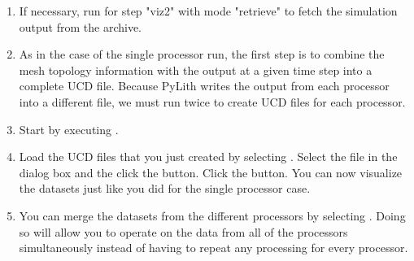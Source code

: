 \begin{enumerate}
\item If necessary, run  for step "viz2" with mode
  "retrieve" to fetch the simulation output from the archive.

  \begin{screen}
    \shellprompt{}
  \end{screen}
  
\item As in the case of the single processor run, the first step is to
  combine the mesh topology information with the output at a given
  time step into a complete UCD file. Because PyLith writes the output
  from each processor into a different file, we must run 
  twice to create UCD files for each processor.

  \begin{screen}
    \shellprompt{}
    \shellprompt{}
  \end{screen}

\item Start  by executing .

  \begin{screen}
    \shellprompt{}
  \end{screen}
  
\item Load the UCD files that you just created by selecting
  \guiselect{}. Select the file in
  the dialog box and the click the  button. Click the
   button. You can now visualize the datasets just
  like you did for the single processor case.
\item You can merge the datasets from the different processors by
  selecting \guiselect{}. Doing so
  will allow you to operate on the data from all of the processors
  simultaneously instead of having to repeat any processing for every
  processor.
\end{enumerate}

